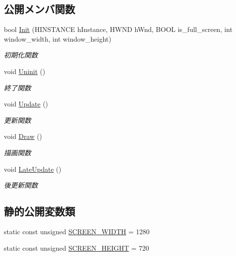 \subsection*{公開メンバ関数}
\begin{DoxyCompactItemize}
\item 
bool \mbox{\hyperlink{class_game_engine_ad81b6f7addc348ca2df872f10fc8a883}{Init}} (H\+I\+N\+S\+T\+A\+N\+CE h\+Instance, H\+W\+ND h\+Wnd, B\+O\+OL is\+\_\+full\+\_\+screen, int window\+\_\+width, int window\+\_\+height)
\begin{DoxyCompactList}\small\item\em 初期化関数 \end{DoxyCompactList}\item 
void \mbox{\hyperlink{class_game_engine_aa89b63164382b8a5e34dc985a876be11}{Uninit}} ()
\begin{DoxyCompactList}\small\item\em 終了関数 \end{DoxyCompactList}\item 
void \mbox{\hyperlink{class_game_engine_ae831b6dee7c10ddc3cf5bc5d217031b1}{Update}} ()
\begin{DoxyCompactList}\small\item\em 更新関数 \end{DoxyCompactList}\item 
void \mbox{\hyperlink{class_game_engine_a259a60d31a1ebd408b4c29b06575d688}{Draw}} ()
\begin{DoxyCompactList}\small\item\em 描画関数 \end{DoxyCompactList}\item 
void \mbox{\hyperlink{class_game_engine_af94d2db03b7e638128920becc054d5ec}{Late\+Update}} ()
\begin{DoxyCompactList}\small\item\em 後更新関数 \end{DoxyCompactList}\end{DoxyCompactItemize}
\subsection*{静的公開変数類}
\begin{DoxyCompactItemize}
\item 
static const unsigned \mbox{\hyperlink{class_game_engine_a6883e12a8088b16c8cbd348d25c5811a}{S\+C\+R\+E\+E\+N\+\_\+\+W\+I\+D\+TH}} = 1280
\item 
static const unsigned \mbox{\hyperlink{class_game_engine_af7eb97ab8c2a0c69db805d7750abef98}{S\+C\+R\+E\+E\+N\+\_\+\+H\+E\+I\+G\+HT}} = 720
\end{DoxyCompactItemize}

